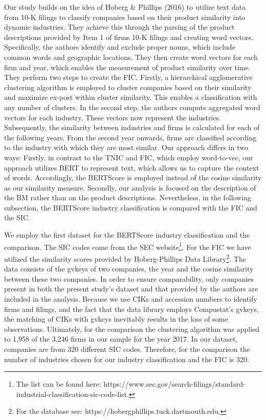 \documentclass[
]{article}
\begin{document}
Our study builds on the idea of Hoberg \& Phillips (2016) to utilize
text data from 10-K filings to classify companies based on their product
similarity into dynamic industries. They achieve this through the
parsing of the product descriptions provided by Item 1 of firms 10-K
filings and creating word vectors. Specifically, the authors identify
and exclude proper nouns, which include common words and geographic
locations. They then create word vectors for each firm and year, which
enables the measurement of product similarity over time. They perform
two steps to create the FIC. Firstly, a hierarchical agglomerative
clustering algorithm is employed to cluster companies based on their
similarity and maximize ex-post within cluster similarity. This enables
a classification with any number of clusters. In the second step, the
authors compute aggregated word vectors for each industry. These vectors
now represent the industries. Subsequently, the similarity between
industries and firms is calculated for each of the following years. From
the second year onwards, firms are classified according to the industry
with which they are most similar. Our approach differs in two ways:
Firstly, in contrast to the TNIC and FIC, which employ word-to-vec, our
approach utilizes BERT to represent text, which allows us to capture the
context of words. Accordingly, the BERTScore is employed instead of the
cosine similarity as our similarity measure. Secondly, our analysis is
focused on the description of the BM rather than on the product
descriptions. Nevertheless, in the following subsection, the BERTScore
industry classification is compared with the FIC and the SIC.

We employ the first dataset for the BERTScore industry classification
and the comparison. The SIC codes come from the SEC website\footnote{The
  list can be found here:
  https://www.sec.gov/search-filings/standard-industrial-classification-sic-code-list.}.
For the FIC we have utilized the similarity scores provided by
Hoberg-Phillips Data Library\footnote{For the database see:
  https://hobergphillips.tuck.dartmouth.edu.}. The data consists of the
gvkeys of two companies, the year and the cosine similarity between
these two companies. In order to ensure comparability, only companies
present in both the present study's dataset and that provided by the
authors are included in the analysis. Because we use CIKs and accession
numbers to identify firms and filings, and the fact that the data
library employs Compustat's gvkeys, the matching of CIKs with gvkeys
inevitably results in the loss of some observations. Ultimately, for the
comparison the clustering algorithm was applied to 1,958 of the 3,246
firms in our sample for the year 2017. In our dataset, companies are
from 320 different SIC codes. Therefore, for the comparison the number
of industries chosen for our industry classification and the FIC is 320.
\end{document}
